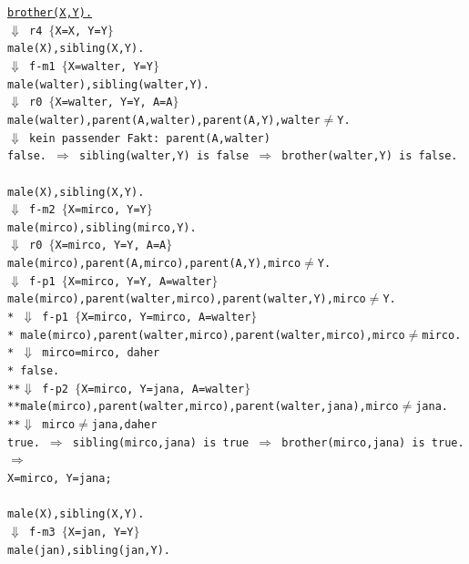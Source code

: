 \documentclass[11pt]{article}
\begin{document}
 \texttt{\underline{brother(X,Y).}\\
 $\Downarrow$ r4 $\lbrace$X=X, Y=Y$\rbrace$\\
 male(X),sibling(X,Y).\\
 $\Downarrow$ f-m1 $\lbrace$X=walter, Y=Y$\rbrace$\\
 male(walter),sibling(walter,Y).\\
 $\Downarrow$ r0 $\lbrace$X=walter, Y=Y, A=A$\rbrace$\\
 male(walter),parent(A,walter),parent(A,Y),walter$\neq$Y.\\
 $\Downarrow$  kein passender Fakt: parent(A,walter)\\
 false. $\Rightarrow$ sibling(walter,Y)  is false $\Rightarrow$ brother(walter,Y) is false. \\
 \\
 male(X),sibling(X,Y).\\
 $\Downarrow$ f-m2 $\lbrace$X=mirco, Y=Y$\rbrace$\\
 male(mirco),sibling(mirco,Y).\\
 $\Downarrow$ r0 $\lbrace$X=mirco, Y=Y, A=A$\rbrace$\\
 male(mirco),parent(A,mirco),parent(A,Y),mirco$\neq$Y. \\
 $\Downarrow$ f-p1 $\lbrace$X=mirco, Y=Y, A=walter$\rbrace$\\
 male(mirco),parent(walter,mirco),parent(walter,Y),mirco$\neq$Y. \\
*  $\Downarrow$ f-p1 $\lbrace$X=mirco, Y=mirco, A=walter$\rbrace$\\
* male(mirco),parent(walter,mirco),parent(walter,mirco),mirco$\neq$mirco. \\
*  $\Downarrow$  mirco=mirco, daher\\
* false. \\
**$\Downarrow$ f-p2 $\lbrace$X=mirco, Y=jana, A=walter$\rbrace$\\
**male(mirco),parent(walter,mirco),parent(walter,jana),mirco$\neq$jana. \\
**$\Downarrow$ mirco$\neq$jana,daher \\
true. $\Rightarrow$ sibling(mirco,jana)  is true $\Rightarrow$ brother(mirco,jana) is true. $\Rightarrow$\\
 X=mirco, Y=jana;\\
\\
male(X),sibling(X,Y).\\
 $\Downarrow$ f-m3 $\lbrace$X=jan, Y=Y$\rbrace$\\
 male(jan),sibling(jan,Y).\\
}
\end{document}
